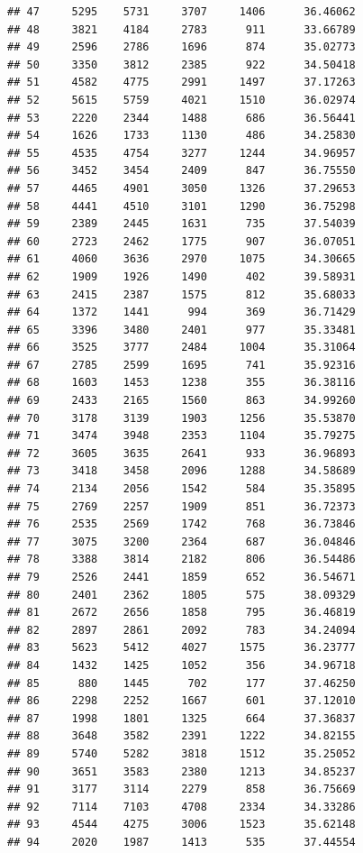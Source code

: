\documentclass[
]{article}
\begin{document}
\begin{verbatim}
## 47     5295    5731     3707     1406      36.46062
## 48     3821    4184     2783      911      33.66789
## 49     2596    2786     1696      874      35.02773
## 50     3350    3812     2385      922      34.50418
## 51     4582    4775     2991     1497      37.17263
## 52     5615    5759     4021     1510      36.02974
## 53     2220    2344     1488      686      36.56441
## 54     1626    1733     1130      486      34.25830
## 55     4535    4754     3277     1244      34.96957
## 56     3452    3454     2409      847      36.75550
## 57     4465    4901     3050     1326      37.29653
## 58     4441    4510     3101     1290      36.75298
## 59     2389    2445     1631      735      37.54039
## 60     2723    2462     1775      907      36.07051
## 61     4060    3636     2970     1075      34.30665
## 62     1909    1926     1490      402      39.58931
## 63     2415    2387     1575      812      35.68033
## 64     1372    1441      994      369      36.71429
## 65     3396    3480     2401      977      35.33481
## 66     3525    3777     2484     1004      35.31064
## 67     2785    2599     1695      741      35.92316
## 68     1603    1453     1238      355      36.38116
## 69     2433    2165     1560      863      34.99260
## 70     3178    3139     1903     1256      35.53870
## 71     3474    3948     2353     1104      35.79275
## 72     3605    3635     2641      933      36.96893
## 73     3418    3458     2096     1288      34.58689
## 74     2134    2056     1542      584      35.35895
## 75     2769    2257     1909      851      36.72373
## 76     2535    2569     1742      768      36.73846
## 77     3075    3200     2364      687      36.04846
## 78     3388    3814     2182      806      36.54486
## 79     2526    2441     1859      652      36.54671
## 80     2401    2362     1805      575      38.09329
## 81     2672    2656     1858      795      36.46819
## 82     2897    2861     2092      783      34.24094
## 83     5623    5412     4027     1575      36.23777
## 84     1432    1425     1052      356      34.96718
## 85      880    1445      702      177      37.46250
## 86     2298    2252     1667      601      37.12010
## 87     1998    1801     1325      664      37.36837
## 88     3648    3582     2391     1222      34.82155
## 89     5740    5282     3818     1512      35.25052
## 90     3651    3583     2380     1213      34.85237
## 91     3177    3114     2279      858      36.75669
## 92     7114    7103     4708     2334      34.33286
## 93     4544    4275     3006     1523      35.62148
## 94     2020    1987     1413      535      37.44554

\end{verbatim}
\end{document}
